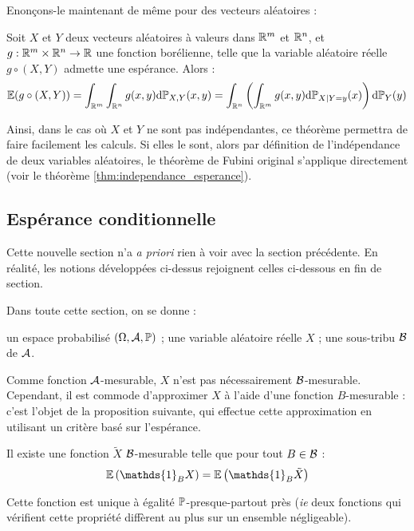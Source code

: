\documentclass[../integ-proba.tex]{subfiles}
\begin{document}
    Enonçons-le maintenant de même pour des vecteurs aléatoires :

    \begin{thm}
        Soit $X$ et $Y$ deux vecteurs aléatoires à valeurs dans $\mathbb{R}^m$ et $\mathbb{R}^n$, et $g : \mathbb{R}^m \times \mathbb{R}^n \rightarrow \mathbb{R}$ une fonction borélienne, telle que la variable aléatoire réelle $g \circ (X,Y)$ admette une espérance.
        Alors :
        \begin{displaymath}
            \mathbb{E}(g \circ (X,Y)) = \int_{\mathbb{R}^m} \int_{\mathbb{R}^n} g(x,y) \textnormal{d} \mathbb{P}_{X,Y} (x,y) = \int_{\mathbb{R}^n} \left( \int_{\mathbb{R}^m} g(x,y) \textnormal{d}\mathbb{P}_{X | Y=y} (x) \right) \textnormal{d} \mathbb{P}_Y (y)
        \end{displaymath}
    \end{thm}

    \begin{rem}
        Ainsi, dans le cas où $X$ et $Y$ ne sont pas indépendantes, ce théorème permettra de faire facilement les calculs.
        Si elles le sont, alors par définition de l'indépendance de deux variables aléatoires, le théorème de Fubini \og original \fg{} s'applique directement (voir le théorème \ref{thm:independance_esperance}).
    \end{rem}

    \subsection{Espérance conditionnelle}

    Cette nouvelle section n'a \textit{a priori} rien à voir avec la section précédente.
    En réalité, les notions développées ci-dessus rejoignent celles ci-dessous en fin de section.

    Dans toute cette section, on se donne :
    \begin{itemize}
        \itemb un espace probabilisé $\left( \Omega, \mathcal{A}, \mathbb{P} \right)$ ;
        \itemb une variable aléatoire réelle $X$ ;
        \itemb une sous-tribu $\mathcal{B}$ de $\mathcal{A}$.
    \end{itemize}

    Comme fonction $\mathcal{A}$-mesurable, $X$ n'est pas nécessairement $\mathcal{B}$-mesurable.
    Cependant, il est commode \og d'approximer \fg{} $X$ à l'aide d'une fonction $B$-mesurable : c'est l'objet de la proposition suivante, qui effectue cette \og approximation \fg{} en utilisant un critère basé sur l'espérance.

    \begin{prop}
        Il existe une fonction $\tilde{X}$ $\mathcal{B}$-mesurable telle que pour tout $B \in \mathcal{B}$ :
        \begin{displaymath}
            \esp\left( \mathds{1}_B X \right) = \esp\left( \mathds{1}_B \tilde{X} \right)
        \end{displaymath}

        Cette fonction est unique à égalité $\mathbb{P}$-presque-partout près (\textit{ie} deux fonctions qui vérifient cette propriété diffèrent au plus sur un ensemble négligeable).
    \end{prop}
\end{document}
